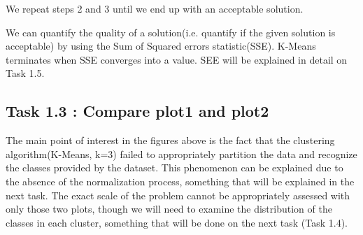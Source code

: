 \documentclass[11pt]{article}
\begin{document}

				We repeat steps 2 and 3 until we end up with an acceptable solution.

				We can quantify the quality of a solution(i.e. quantify if the given solution is acceptable) by using the Sum of Squared errors statistic(SSE). K-Means terminates when SSE converges into a value. SEE will be explained in detail on Task 1.5.
				
		 \subsection*{Task 1.3 : Compare plot1 and plot2}
			The main point of interest in the figures above is the fact that the clustering algorithm(K-Means, k=3) failed to appropriately partition the data and recognize the classes provided by the dataset. This phenomenon can be explained due to the absence of the normalization process, something that will be explained in the next task. The exact scale of the problem cannot be appropriately assessed with only those two plots, though we will need to examine the distribution of the classes in each cluster, something that will be done on the next task (Task 1.4).
		
\end{document}
